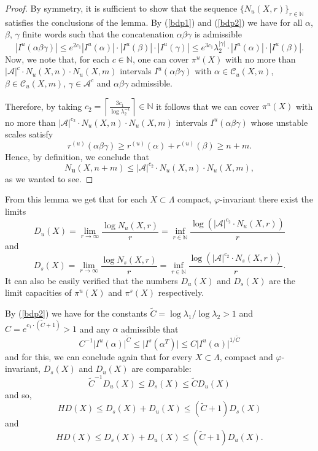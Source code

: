\documentclass[12pt]{amsart}
\providecommand{\abs}[1]{\lvert#1\rvert}
\theoremstyle{plain} %
\theoremstyle{definition} %
\numberwithin{equation}{section}
\begin{document}
\begin{proof}By symmetry, it is sufficient to show that the sequence $\{N_u(X,r)\}_{r\in\mathbb{N}}$ satisfies the conclusions of the lemma. By (\ref{bdp1}) and (\ref{bdp2}) we have for all $\alpha$, $\beta$, $\gamma$ finite words such that the concatenation $\alpha\beta \gamma$ is admissible
$$|I^u(\alpha\beta \gamma)|\leq e^{2c_1}|I^u(\alpha)|\cdot |I^u(\beta)|\cdot |I^u(\gamma)|\leq  e^{3c_1}\lambda_2^{\abs{\gamma}}\cdot|I^u(\alpha)|\cdot |I^u(\beta)|.$$
Now, we note that, for each $c\in\mathbb{N}$, one can cover $\pi^u(X)$ with no more than $\abs{\mathcal{A}}^{c}\cdot N_u(X,n)\cdot N_u(X,m)$ intervals $I^u(\alpha\beta \gamma)$ with $\alpha\in \mathcal{C}_u(X,n)$, $\beta\in \mathcal{C}_u(X,m)$, $\gamma\in\mathcal{A}^c$ and $\alpha\beta \gamma$ admissible.

Therefore, by taking $c_2=\left\lceil\frac{3c_1}{\log\lambda_2^{-1}}\right\rceil\in\mathbb{N}$
it follows that we can cover $\pi^u(X)$ with no more than $\abs{\mathcal{A}}^{c_2}\cdot N_u(X,n)\cdot N_u(X,m)$ intervals $I^u(\alpha\beta \gamma)$ whose unstable scales satisfy 
$$r^{(u)}(\alpha\beta \gamma)\geq r^{(u)}(\alpha)+r^{(u)}(\beta)\geq n+m.$$
Hence, by definition, we conclude that 
$$N_\textbf{u}(X,n+m)\leq \abs{\mathcal{A}}^{c_2}\cdot N_u(X,n)\cdot N_u(X,m),$$
as we wanted to see.
\end{proof}

From this lemma we get that for each $X\subset \Lambda$ compact, $\varphi$-invariant there exist the limits 
\begin{equation}\label{du}
    D_u(X)=\lim_{r\to \infty}\dfrac{\log N_u(X,r)}{r}=\inf\limits_{r\in\mathbb{N}}\dfrac{\log (|\mathcal{A}|^{c_2}\cdot N_u(X,r))}{r}
    \end{equation}
and	
\begin{equation}
D_s(X)=\lim_{r\to \infty}\dfrac{\log N_s(X,r)}{r}=\inf\limits_{r\in\mathbb{N}}\dfrac{\log (|\mathcal{A}|^{c_2}\cdot N_s(X,r))}{r}.
\end{equation}
It can also be easily verified that the numbers $D_u(X)$ and $D_s(X)$ are the limit capacities of $\pi^u(X)$ and $\pi^s(X)$ respectively.

By (\ref{bdp2}) we have for the constants $\tilde{C}=\log \lambda_1/\log \lambda_2>1$ and $C=e^{c_1\cdot(\tilde{C}+1)}>1$ and any $\alpha$ admissible that
\begin{equation}\label{conservative}
 C^{-1}\abs{I^u(\alpha)}^{\tilde{C}} \leq \abs{I^s(\alpha^T)} \leq C \abs{I^u(\alpha)}^{1/\tilde{C}}
\end{equation}
and for this, we can conclude again that for every $X\subset \Lambda$, compact and $\varphi$-invariant, $D_s(X)$ and $D_u(X)$ are comparable:
\begin{equation}\label{beta}
 \tilde{C}^{-1} D_u(X) \leq D_s(X) \leq \tilde{C} D_u(X)
\end{equation}
and so,
\begin{equation}\label{Ds}
  HD(X)\leq D_s(X)+D_u(X)\leq (\tilde{C}+1)D_s(X)  
\end{equation}
and 
\begin{equation}\label{Du}
   HD(X)\leq D_s(X)+D_u(X)\leq (\tilde{C}+1)D_u(X). 
\end{equation}
\end{document}
